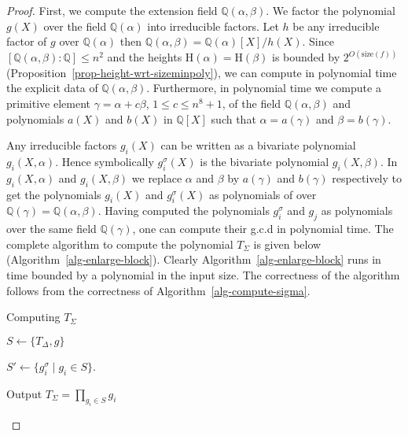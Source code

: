\documentclass[11pt]{madras}%
\theoremstyle{remark}
\newcommand{\size}[1]{{\ensuremath{\mathrm{size}\left(#1\right)}}}
\newcommand{\Height}[1]{\ensuremath{\mathrm{H}\left(#1\right)}}
\begin{document}
\begin{proof}
  First, we compute the extension field $\mathbb{Q}(\alpha,\beta)$. We
  factor the polynomial $g(X)$ over the field $\mathbb{Q}(\alpha)$
  into irreducible factors.  Let $h$ be any irreducible factor of $g$
  over $\mathbb{Q}(\alpha)$ then $\mathbb{Q}(\alpha,\beta)=\mathbb{Q}
  (\alpha)[X]/h(X)$. Since $[\mathbb{Q}(\alpha,\beta):\mathbb{Q}]\leq
  n^2$ and the heights $\Height{\alpha} = \Height{\beta}$ is bounded
  by $2^{O(\size{f})}$
  (Proposition~\ref{prop-height-wrt-sizeminpoly}), we can compute in
  polynomial time the explicit data of $\mathbb{Q}(\alpha,\beta)$.
  Furthermore, in polynomial time we compute a primitive element
  $\gamma = \alpha + c \beta$, $1 \leq c \leq n^8 + 1$, of the field
  $\mathbb{Q}(\alpha,\beta)$ and polynomials $a(X)$ and $b(X)$ in
  $\mathbb{Q}[X]$ such that $\alpha=a(\gamma)$ and $\beta=b(\gamma)$.

  Any irreducible factors $g_i(X)$ can be written as a bivariate
  polynomial $g_i(X,\alpha)$. Hence symbolically $g_i^\sigma(X)$ is
  the bivariate polynomial $g_i(X,\beta)$. In $g_i(X,\alpha)$ and
  $g_i(X,\beta)$ we replace $\alpha$ and $\beta$ by $a(\gamma)$ and
  $b(\gamma)$ respectively to get the polynomials $g_i(X)$ and
  $g_i^\sigma(X)$ as polynomials of over $\mathbb{Q}(\gamma) =
  \mathbb{Q}(\alpha,\beta)$. Having computed the polynomials
  $g_i^\sigma$ and $g_j$ as polynomials over the same field
  $\mathbb{Q}(\gamma)$, one can compute their g.c.d in polynomial
  time.  The complete algorithm to compute the polynomial $T_\Sigma$
  is given below (Algorithm~\ref{alg-enlarge-block}).  Clearly
  Algorithm~\ref{alg-enlarge-block} runs in time bounded by a
  polynomial in the input size. The correctness of the algorithm
  follows from the correctness of Algorithm~\ref{alg-compute-sigma}.

  \begin{algorithm}
    \caption{Computing $T_\Sigma$}\label{alg-enlarge-block}

    $S \leftarrow \{T_\Delta,g\}$

    {

      $S' \leftarrow \{g_i^\sigma\mid g_i\in S\}$.
      
      
    } 
    
    Output $T_\Sigma = \prod_{g_i \in S} g_i$ 

 \end{algorithm}
  
  
\end{proof} 
\end{document}
